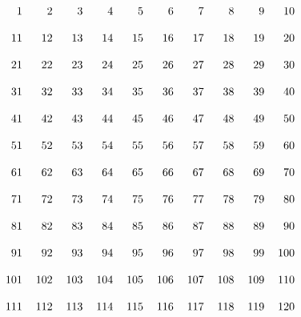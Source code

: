 \documentclass[nooutcomes]{ximera}
\begin{document}
\begin{problem}
\[\begin{tabular}{r r r r r r r r r r}
  1 &   2 &   3 &   4 &   5 &   6 &   7 &   8 &   9 &  10\\
  \\
 11 &  12 &  13 &  14 &  15 &  16 &  17 &  18 &  19 &  20\\
 \\
 21 &  22 &  23 &  24 &  25 &  26 &  27 &  28 &  29 &  30\\
 \\
 31 &  32 &  33 &  34 &  35 &  36 &  37 &  38 &  39 &  40\\
 \\
 41 &  42 &  43 &  44 &  45 &  46 &  47 &  48 &  49 &  50\\
 \\
 51 &  52 &  53 &  54 &  55 &  56 &  57 &  58 &  59 &  60\\
 \\
 61 &  62 &  63 &  64 &  65 &  66 &  67 &  68 &  69 &  70\\
 \\
 71 &  72 &  73 &  74 &  75 &  76 &  77 &  78 &  79 &  80\\
 \\
 81 &  82 &  83 &  84 &  85 &  86 &  87 &  88 &  89 &  90\\
 \\
 91 &  92 &  93 &  94 &  95 &  96 &  97 &  98 &  99 & 100\\
 \\
101 & 102 & 103 & 104 & 105 & 106 & 107 & 108 & 109 & 110\\
\\
111 & 112 & 113 & 114 & 115 & 116 & 117 & 118 & 119 & 120\\
\end{tabular}
\]
\end{problem}


\end{document}
